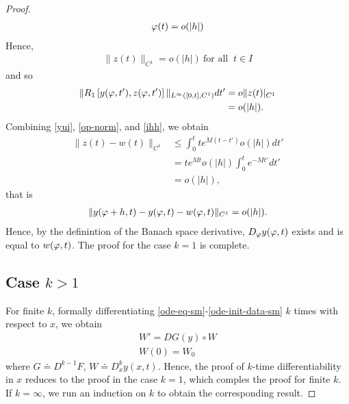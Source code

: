 \begin{proof}
%
%
\begin{equation*}
\begin{split}
  \varphi(t) = o(|h|)
\end{split}
\end{equation*}
%
%
Hence,
%
%
\begin{equation*}
\begin{split}
  \| z(t) \|_{C^{1}}  =  o (| h | ) \ \text{for all } \ t \in I
\end{split}
\end{equation*}
%
%
and so
%
\begin{equation}
  \begin{split}
    \label{ihh}
    \| R_{1}\left[ y(\varphi,t'), z(\varphi,t')
    \right] \|_{L^{\infty}\left( [0,t], C^{1} \right)} dt' 
    & = o\| z(t) |_{C^{1}} 
    \\
    & = o(| h |).
  \end{split}
\end{equation}
%
%
%
Combining \eqref{yui}, \eqref{op-norm}, and \eqref{ihh}, we obtain
%
%
\begin{equation*}
\begin{split}
  \| z(t) - w(t) \|_{C^{1}} 
  & \le \int_{0}^{t} t e^{M(t - t')} o(| h
  |) dt'
  \\
  & = te^{Mt} o(| h |) \int_{0}^{t} e^{-Mt'} dt'
  \\
  & = o(| h |),
\end{split}
\end{equation*}
%
%
that is
%
%
\begin{equation*}
\begin{split}
  \| y(\varphi + h, t) - y(\varphi,t) - w(\varphi,t) \|_{C^{1}} = o(| h |).
\end{split}
\end{equation*}
%
%
Hence, by the definintion of the Banach space derivative, $D_{\varphi}y(\varphi,t)$ exists and
is equal to $w(\varphi,t)$. The proof for the case $k=1$ is complete.
\subsection{Case $k >1$} 
\label{ssec:case-kg1}
For finite $k$, formally differentiating
\eqref{ode-eq-sm}-\eqref{ode-init-data-sm}
$k$ times with respect to $x$, we obtain
\begin{gather*}
  W' = DG(y) \circ W
  \\
  W(0) = W_{0}
\end{gather*}
where $G \doteq D^{k-1}F$, $W \doteq D_{x}^{k} y(x,t)$. Hence, the proof of
$k$-time differentiability in $x$ reduces to the proof in the case $k=1$, which
comples the proof for finite $k$. If $k = \infty$, we run an induction on $k$ to
obtain the corresponding result.
\end{proof}

